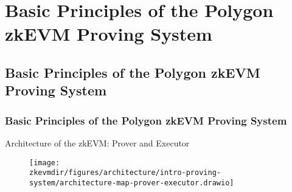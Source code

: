 

\renewcommand{\mytitle}{Basic Principles of the Polygon zkEVM Proving System}
\ifZEROSEC \fi
\ifSEC \section{\mytitle{}}\fi
\ifSUBSEC \subsection{\mytitle{}}\fi
\ifSUBSUBSEC \subsubsection{\mytitle{}}\fi


\ifARCHMAP
\begin{frame}{Architecture of the zkEVM: Prover and Executor}
\begin{figure}
\texttt{[image: \\zkevmdir/figures/architecture/intro-proving-system/architecture-map-prover-executor.drawio]}
\end{figure}
\end{frame}



